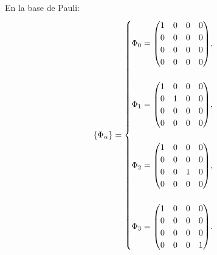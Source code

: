 \documentclass[11pt,letterpaper]{article}
\begin{document}
En la base de Pauli:
\begin{equation}
\{ \Phi _{\alpha} \}= 
\begin{cases}
\Phi _0 = \mqty(1 & 0 & 0 & 0\\ 0 & 0 & 0 & 0\\ 0 & 0 & 0 & 0\\ 0 & 0 & 0 & 0), \\
\\
\Phi _1 = \mqty(1 & 0 & 0 & 0\\ 0 & 1 & 0 & 0\\ 0 & 0 & 0 & 0\\ 0 & 0 & 0 & 0), \\
\\
\Phi _2 = \mqty(1 & 0 & 0 & 0\\ 0 & 0 & 0 & 0\\ 0 & 0 & 1 & 0\\ 0 & 0 & 0 & 0), \\
\\
\Phi _3 = \mqty(1 & 0 & 0 & 0\\ 0 & 0 & 0 & 0\\ 0 & 0 & 0 & 0\\ 0 & 0 & 0 & 1). \\
\end{cases}
\label{eq:Phi_alphas-1qubit}
\end{equation}




	
	
\end{document}
